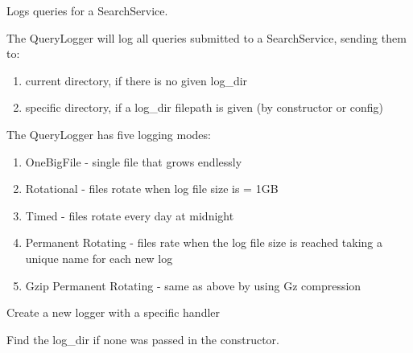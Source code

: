 \documentclass[letterpaper,10pt,english]{sphinxmanual}
\begin{document}
\begin{fulllineitems}
\label{api3.0:puppy.logging.QueryLogger}
Logs queries for a SearchService.

The QueryLogger will log all queries submitted to a SearchService, sending them to:
\begin{enumerate}
\item {} 
current directory, if there is no given log\_dir

\item {} 
specific directory, if a log\_dir filepath is given (by constructor or config)

\end{enumerate}

The QueryLogger has five logging modes:
\begin{enumerate}
\item {} 
OneBigFile - single file that grows endlessly

\item {} 
Rotational - files rotate when log file size is = 1GB

\item {} 
Timed - files rotate every day at midnight

\item {} 
Permanent Rotating - files rate when the log file size is reached taking a unique name for each new log

\item {} 
Gzip Permanent Rotating - same as above by using Gz compression

\end{enumerate}

\begin{fulllineitems}
\label{api3.0:puppy.logging.QueryLogger.create_logger}
Create a new logger with a specific handler

\end{fulllineitems}


\begin{fulllineitems}
\label{api3.0:puppy.logging.QueryLogger.get_log_dir}
Find the log\_dir if none was passed in the constructor.


\end{fulllineitems}
\end{fulllineitems}
\end{document}
